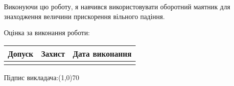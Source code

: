 \documentclass{article}
\begin{document}
{	Виконуючи цю роботу, я навчився використовувати оборотний
	маятник для знаходження величини прискорення вільного
	падіння.

\vspace{350pt}
Оцінка за виконання роботи:
\smallskip

\renewcommand{\arraystretch}{4}
\begin{tabular}{|c|c|c|}
	\hline
	\hspace{15pt} Допуск \hspace{15pt} & \hspace{15pt} Захист \hspace{15pt}
	& \hspace{15pt} Дата виконання \hspace{15pt}\\
	\hline
	 &  & \\
	\hline

\end{tabular}

\bigskip

	\begin{flushright}
		Підпис викладача:\line(1,0){70}\hspace{100pt}\hphantom{1pt}
	\end{flushright}
	}
\end{document}
